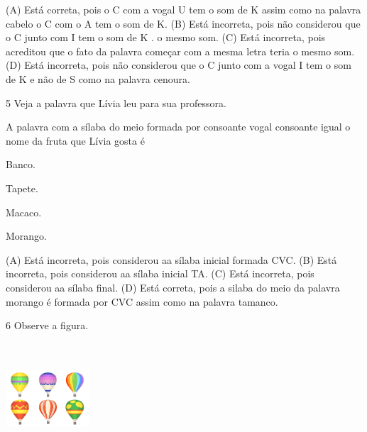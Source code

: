 (A) Está correta, pois o C com a vogal U tem o som de K assim como na
palavra cabelo o C com o A tem o som de K.
(B) Está incorreta, pois não considerou que o C junto com I tem o som de
K . o mesmo som.
(C) Está incorreta, pois acreditou que o fato da palavra começar com a
mesma letra teria o mesmo som.
(D) Está incorreta, pois não considerou que o C junto com a vogal I tem
o som de K e não de S como na palavra cenoura.

\num{5} Veja a palavra que Lívia leu para sua professora.

A palavra com a sílaba do meio formada por consoante vogal consoante
igual o nome da fruta que Lívia gosta é

\begin{minipage}{.5\textwidth}
\begin{escolha}
\item Banco.

\item Tapete.

\item Macaco.

\item Morango.
\end{escolha}
\end{minipage}

(A) Está incorreta, pois considerou aa sílaba inicial formada CVC.
(B) Está incorreta, pois considerou aa sílaba inicial TA.
(C) Está incorreta, pois considerou aa sílaba final.
(D) Está correta, pois a silaba do meio da palavra morango é formada por
CVC assim como na palavra tamanco.

\num{6} Observe a figura.

\includegraphics[width=1.22569in,height=1.65417in]{media/image167.jpeg}


